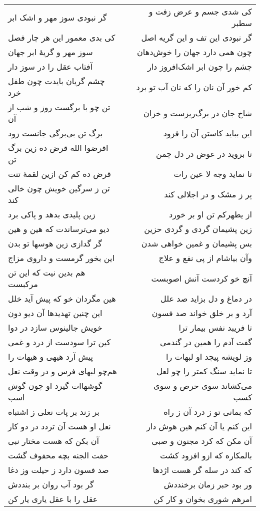 \begin{center}
\begin{longtable}{l p{0.5cm} r}
\\
گر نبودی سوز مهر و اشک ابر
&&
کی شدی جسم و عرض زفت و سطبر
\\
کی بدی معمور این هر چار فصل
&&
گر نبودی این تف و این گریه اصل
\\
سوز مهر و گریهٔ ابر جهان
&&
چون همی دارد جهان را خوش‌دهان
\\
آفتاب عقل را در سوز دار
&&
چشم را چون ابر اشک‌افروز دار
\\
چشم گریان بایدت چون طفل خرد
&&
کم خور آن نان را که نان آب تو برد
\\
تن چو با برگست روز و شب از آن
&&
شاخ جان در برگ‌ریزست و خزان
\\
برگ تن بی‌برگی جانست زود
&&
این بباید کاستن آن را فزود
\\
اقرضوا الله قرض ده زین برگ تن
&&
تا بروید در عوض در دل چمن
\\
قرض ده کم کن ازین لقمهٔ تنت
&&
تا نماید وجه لا عین رات
\\
تن ز سرگین خویش چون خالی کند
&&
پر ز مشک و در اجلالی کند
\\
زین پلیدی بدهد و پاکی برد
&&
از یطهرکم تن او بر خورد
\\
دیو می‌ترساندت که هین و هین
&&
زین پشیمان گردی و گردی حزین
\\
گر گدازی زین هوسها تو بدن
&&
بس پشیمان و غمین خواهی شدن
\\
این بخور گرمست و داروی مزاج
&&
وآن بیاشام از پی نفع و علاج
\\
هم بدین نیت که این تن مرکبست
&&
آنچ خو کردست آنش اصوبست
\\
هین مگردان خو که پیش آید خلل
&&
در دماغ و دل بزاید صد علل
\\
این چنین تهدیدها آن دیو دون
&&
آرد و بر خلق خواند صد فسون
\\
خویش جالینوس سازد در دوا
&&
تا فریبد نفس بیمار ترا
\\
کین ترا سودست از درد و غمی
&&
گفت آدم را همین در گندمی
\\
پیش آرد هیهی و هیهات را
&&
وز لویشه پیچد او لبهات را
\\
هم‌چو لبهای فرس و در وقت نعل
&&
تا نماید سنگ کمتر را چو لعل
\\
گوشهاات گیرد او چون گوش اسب
&&
می‌کشاند سوی حرص و سوی کسب
\\
بر زند بر پات نعلی ز اشتباه
&&
که بمانی تو ز درد آن ز راه
\\
نعل او هست آن تردد در دو کار
&&
این کنم یا آن کنم هین هوش دار
\\
آن بکن که هست مختار نبی
&&
آن مکن که کرد مجنون و صبی
\\
حفت الجنه بچه محفوف گشت
&&
بالمکاره که ازو افزود کشت
\\
صد فسون دارد ز حیلت وز دغا
&&
که کند در سله گر هست اژدها
\\
گر بود آب روان بر بنددش
&&
ور بود حبر زمان برخنددش
\\
عقل را با عقل یاری یار کن
&&
امرهم شوری بخوان و کار کن
\\
\end{longtable}
\end{center}
